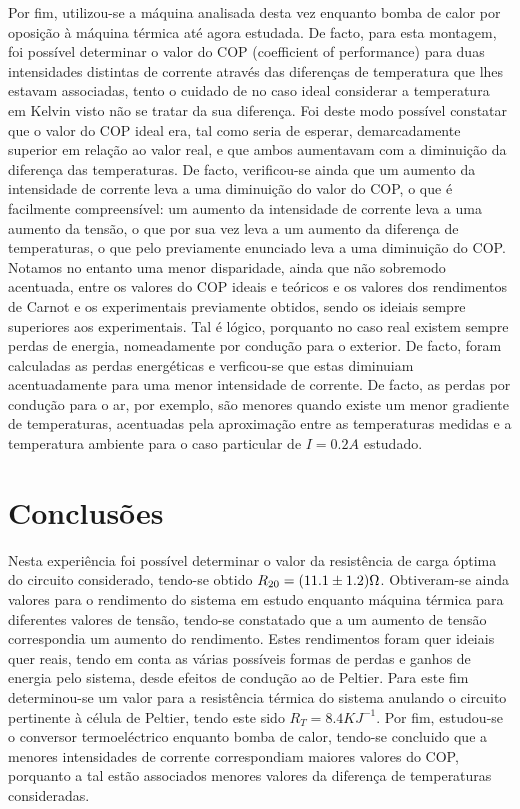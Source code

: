 \documentclass[9pt]{extarticle}
\begin{document}
\begin{multicols}{2}
\par Por fim, utilizou-se a máquina analisada desta vez enquanto bomba de calor por oposição à máquina térmica até agora estudada. De facto, para esta montagem, foi possível determinar o valor do COP (coefficient of performance) para duas intensidades distintas de corrente através das diferenças de temperatura que lhes estavam associadas, tento o cuidado de no caso ideal considerar a temperatura em Kelvin visto não se tratar da sua diferença. Foi deste modo possível constatar que o valor do COP ideal era, tal como seria de esperar, demarcadamente superior em relação ao valor real, e que ambos aumentavam com a diminuição da diferença das temperaturas. De facto, verificou-se ainda que um aumento da intensidade de corrente leva a uma diminuição do valor do COP, o que é facilmente compreensível: um aumento da intensidade de corrente leva a uma aumento da tensão, o que por sua vez leva a um aumento da diferença de temperaturas, o que pelo previamente enunciado leva a uma diminuição do COP. Notamos no entanto uma menor disparidade, ainda que não sobremodo acentuada, entre os valores do COP ideais e teóricos e os valores dos rendimentos de Carnot e os experimentais previamente obtidos, sendo os ideiais sempre superiores aos experimentais. Tal é lógico, porquanto no caso real existem sempre perdas de energia, nomeadamente por condução para o exterior. De facto, foram calculadas as perdas energéticas e verficou-se que estas diminuiam acentuadamente para uma menor intensidade de corrente. De facto, as perdas por condução para o ar, por exemplo, são menores quando existe um menor gradiente de temperaturas, acentuadas pela aproximação entre as temperaturas medidas e a temperatura ambiente para o caso particular de $I=0.2A$ estudado.

\section{Conclusões}

\par Nesta experiência foi possível determinar o valor da resistência de carga óptima do circuito considerado, tendo-se obtido $R_{20}=(11.1\pm1.2)\ohm$. Obtiveram-se ainda valores para o rendimento do sistema em estudo enquanto máquina térmica para diferentes valores de tensão, tendo-se constatado que a um aumento de tensão correspondia um aumento do rendimento. Estes rendimentos foram quer ideiais quer reais, tendo em conta as várias possíveis formas de perdas e ganhos de energia pelo sistema, desde efeitos de condução ao de Peltier. Para este fim determinou-se um valor para a resistência térmica do sistema anulando o circuito pertinente à célula de Peltier, tendo este sido $R_T=8.4KJ^{-1}$. Por fim, estudou-se o conversor termoeléctrico enquanto bomba de calor, tendo-se concluido que a menores intensidades de corrente correspondiam maiores valores do COP, porquanto a tal estão associados menores valores da diferença de temperaturas consideradas.


\end{multicols}
\end{document}
